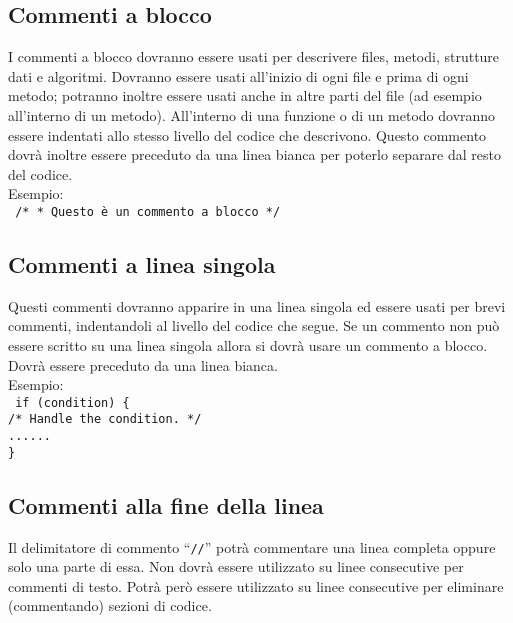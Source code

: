 \subsection{Commenti a blocco}
I commenti a blocco dovranno essere usati per descrivere files, metodi, strutture dati e algoritmi. Dovranno essere usati all'inizio di ogni file e prima di ogni metodo; potranno inoltre essere usati anche in altre parti del file (ad esempio all'interno di un metodo). All'interno di una funzione o di un metodo dovranno essere indentati allo stesso livello del codice che descrivono. Questo commento dovr\`a inoltre essere preceduto da una linea bianca per poterlo separare dal resto del codice. \\
 \newline
Esempio: \\
\texttt{
	/* \newline
	* Questo è un commento a blocco \newline
	*/
} \\
 \newline
\subsection{Commenti a linea singola}
Questi commenti dovranno apparire in una linea singola ed essere usati per brevi commenti, indentandoli al livello del codice che segue. Se un commento non pu\`o essere scritto su una linea singola allora si dovr\`a usare un commento a blocco. Dovr\`a essere preceduto da una linea bianca. \\
 \newline
Esempio: \\
\texttt{
	if (condition) \{ \\
	\phantom{....}/* Handle the condition. */ \\
	\phantom{....}...... \\
	\}
} \\
 \newline
\subsection{Commenti alla fine della linea}
Il delimitatore di commento ``\texttt{//}'' potr\`a commentare una linea completa oppure solo una parte di essa. Non dovr\`a essere utilizzato su linee consecutive per commenti di testo. Potr\`a per\`o essere utilizzato su linee consecutive per eliminare (commentando) sezioni di codice.
